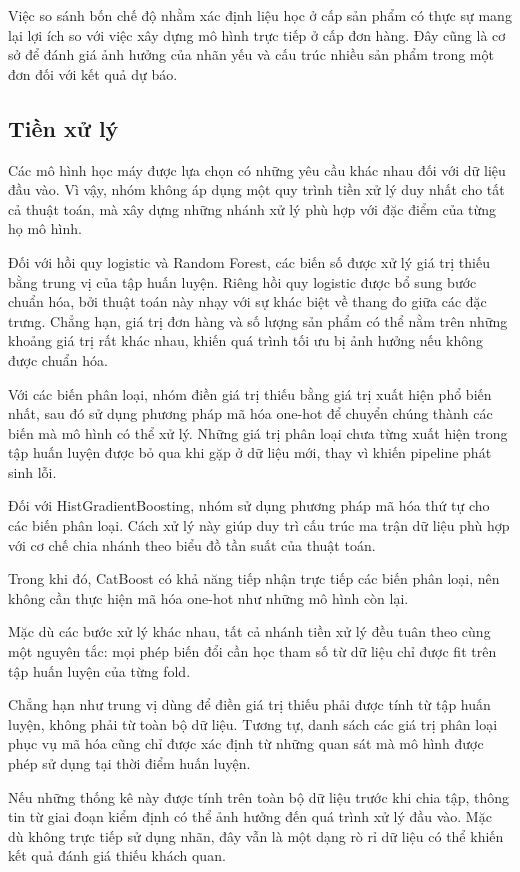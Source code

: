 \documentclass[12pt,a4paper]{report}
\begin{document}
Việc so sánh bốn chế độ nhằm xác định liệu học ở cấp sản phẩm có thực sự mang lại lợi ích so với việc xây dựng mô hình trực tiếp ở cấp đơn hàng. Đây cũng là cơ sở để đánh giá ảnh hưởng của nhãn yếu và cấu trúc nhiều sản phẩm trong một đơn đối với kết quả dự báo.

\subsection{Tiền xử lý}

Các mô hình học máy được lựa chọn có những yêu cầu khác nhau đối với dữ liệu đầu vào. Vì vậy, nhóm không áp dụng một quy trình tiền xử lý duy nhất cho tất cả thuật toán, mà xây dựng những nhánh xử lý phù hợp với đặc điểm của từng họ mô hình.

Đối với hồi quy logistic và Random Forest, các biến số được xử lý giá trị thiếu bằng trung vị của tập huấn luyện. Riêng hồi quy logistic được bổ sung bước chuẩn hóa, bởi thuật toán này nhạy với sự khác biệt về thang đo giữa các đặc trưng. Chẳng hạn, giá trị đơn hàng và số lượng sản phẩm có thể nằm trên những khoảng giá trị rất khác nhau, khiến quá trình tối ưu bị ảnh hưởng nếu không được chuẩn hóa.

Với các biến phân loại, nhóm điền giá trị thiếu bằng giá trị xuất hiện phổ biến nhất, sau đó sử dụng phương pháp mã hóa one-hot để chuyển chúng thành các biến mà mô hình có thể xử lý. Những giá trị phân loại chưa từng xuất hiện trong tập huấn luyện được bỏ qua khi gặp ở dữ liệu mới, thay vì khiến pipeline phát sinh lỗi.

Đối với HistGradientBoosting, nhóm sử dụng phương pháp mã hóa thứ tự cho các biến phân loại. Cách xử lý này giúp duy trì cấu trúc ma trận dữ liệu phù hợp với cơ chế chia nhánh theo biểu đồ tần suất của thuật toán.

Trong khi đó, CatBoost có khả năng tiếp nhận trực tiếp các biến phân loại, nên không cần thực hiện mã hóa one-hot như những mô hình còn lại.

Mặc dù các bước xử lý khác nhau, tất cả nhánh tiền xử lý đều tuân theo cùng một nguyên tắc: mọi phép biến đổi cần học tham số từ dữ liệu chỉ được fit trên tập huấn luyện của từng fold.

Chẳng hạn như trung vị dùng để điền giá trị thiếu phải được tính từ tập huấn luyện, không phải từ toàn bộ dữ liệu. Tương tự, danh sách các giá trị phân loại phục vụ mã hóa cũng chỉ được xác định từ những quan sát mà mô hình được phép sử dụng tại thời điểm huấn luyện.

Nếu những thống kê này được tính trên toàn bộ dữ liệu trước khi chia tập, thông tin từ giai đoạn kiểm định có thể ảnh hưởng đến quá trình xử lý đầu vào. Mặc dù không trực tiếp sử dụng nhãn, đây vẫn là một dạng rò rỉ dữ liệu có thể khiến kết quả đánh giá thiếu khách quan.
\end{document}
